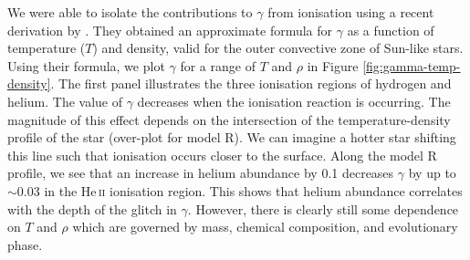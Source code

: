 We were able to isolate the contributions to \(\gamma\) from ionisation using a recent derivation by \citet{Houdayer.Reese.ea2021}. They obtained an approximate formula for \(\gamma\) as a function of temperature (\(T\)) and density, valid for the outer convective zone of Sun-like stars. Using their formula, we plot \(\gamma\) for a range of \(T\) and \(\rho\) in Figure \ref{fig:gamma-temp-density}. The first panel illustrates the three ionisation regions of hydrogen and helium. The value of \(\gamma\) decreases when the ionisation reaction is occurring. The magnitude of this effect depends on the intersection of the temperature-density profile of the star (over-plot for model R). We can imagine a hotter star shifting this line such that ionisation occurs closer to the surface. Along the model R profile, we see that an increase in helium abundance by 0.1 decreases \(\gamma\) by up to \(\sim 0.03\) in the He\,\textsc{ii} ionisation region. This shows that helium abundance correlates with the depth of the glitch in \(\gamma\). However, there is clearly still some dependence on \(T\) and \(\rho\) which are governed by mass, chemical composition, and evolutionary phase.

